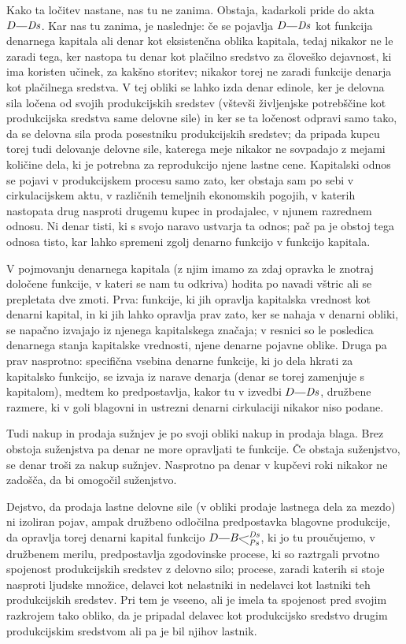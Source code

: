 \documentclass[kapital_02.tex]{subfiles}
\begin{document}
Kako ta ločitev nastane, nas tu ne zanima. Obstaja, kadarkoli pride do akta \(\KPED\KPEcrta\KPEDs\). Kar nas tu zanima, je naslednje: če se pojavlja \(\KPED\KPEcrta\KPEDs\) kot funkcija denarnega kapitala ali denar kot eksistenčna oblika kapitala, tedaj nikakor ne le zaradi tega, ker nastopa tu denar kot plačilno sredstvo za človeško dejavnost, ki ima koristen učinek, za kakšno storitev; nikakor torej ne zaradi funkcije denarja kot plačilnega sredstva. V tej obliki se lahko izda denar edinole, ker je delovna sila ločena od svojih produkcijskih sredstev (vštevši življenjske potrebščine kot produkcijska sredstva same delovne sile) in ker se ta ločenost odpravi samo tako, da se delovna sila proda posestniku produkcijskih sredstev; da pripada kupcu torej tudi delovanje delovne sile, katerega meje nikakor ne sovpadajo z mejami količine dela, ki je potrebna za reprodukcijo njene lastne cene. Kapitalski odnos se pojavi v produkcijskem procesu samo zato, ker obstaja sam po sebi v cirkulacijskem aktu, v različnih temeljnih ekonomskih pogojih, v katerih nastopata drug nasproti drugemu kupec in prodajalec, v njunem razrednem odnosu. Ni denar tisti, ki s svojo naravo ustvarja ta odnos; pač pa je obstoj tega odnosa tisto, kar lahko spremeni zgolj denarno funkcijo v funkcijo kapitala.

V pojmovanju denarnega kapitala (z njim imamo za zdaj opravka le znotraj določene funkcije, v kateri se nam tu odkriva) hodita po navadi vštric ali se prepletata dve zmoti. Prva: funkcije, ki jih opravlja kapitalska vrednost kot denarni kapital, in ki jih lahko opravlja prav zato, ker se nahaja v denarni obliki, se napačno izvajajo iz njenega kapitalskega značaja; v resnici so le posledica denarnega stanja kapitalske vrednosti, njene denarne pojavne oblike. Druga pa prav nasprotno: specifična vsebina denarne funkcije, ki jo dela hkrati za kapitalsko funkcijo, se izvaja iz narave denarja (denar se torej zamenjuje s kapitalom), medtem ko predpostavlja, kakor tu v izvedbi \(\KPED\KPEcrta\KPEDs\), družbene razmere, ki v goli blagovni in ustrezni denarni cirkulaciji nikakor niso podane.

Tudi nakup in prodaja sužnjev je po svoji obliki nakup in prodaja blaga. Brez obstoja suženjstva pa denar ne more opravljati te funkcije. Če obstaja suženjstvo, se denar troši za nakup sužnjev. Nasprotno pa denar v kupčevi roki nikakor ne zadošča, da bi omogočil suženjstvo.

Dejstvo, da prodaja lastne delovne sile (v obliki prodaje lastnega dela za mezdo) ni izoliran pojav, ampak družbeno odločilna predpostavka blagovne produkcije, da opravlja torej denarni kapital funkcijo \(\KPED\KPEcrta\KPEBrazcepDsPs\), ki jo tu proučujemo, v družbenem merilu, predpostavlja zgodovinske procese, ki so raztrgali prvotno spojenost produkcijskih sredstev z delovno silo; procese, zaradi katerih si stoje nasproti ljudske množice, delavci kot nelastniki in nedelavci kot lastniki teh produkcijskih sredstev. Pri tem je vseeno, ali je imela ta spojenost pred svojim razkrojem tako obliko, da je pripadal delavec kot produkcijsko sredstvo drugim produkcijskim sredstvom ali pa je bil njihov lastnik.
\end{document}
